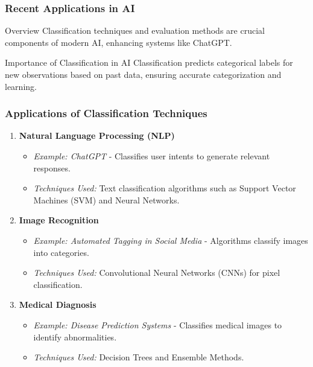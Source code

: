 \documentclass[aspectratio=169]{beamer}
\begin{document}
\begin{frame}[fragile]
    \frametitle{Recent Applications in AI}
    
    \begin{block}{Overview}
        Classification techniques and evaluation methods are crucial components of modern AI, enhancing systems like ChatGPT.
    \end{block}
    
    \begin{block}{Importance of Classification in AI}
        Classification predicts categorical labels for new observations based on past data, ensuring accurate categorization and learning.
    \end{block}
\end{frame}

\begin{frame}[fragile]
    \frametitle{Applications of Classification Techniques}
    
    \begin{enumerate}
        \item \textbf{Natural Language Processing (NLP)}
            \begin{itemize}
                \item \textit{Example: ChatGPT} - Classifies user intents to generate relevant responses.
                \item \textit{Techniques Used:} Text classification algorithms such as Support Vector Machines (SVM) and Neural Networks.
            \end{itemize}
        
        \item \textbf{Image Recognition}
            \begin{itemize}
                \item \textit{Example: Automated Tagging in Social Media} - Algorithms classify images into categories.
                \item \textit{Techniques Used:} Convolutional Neural Networks (CNNs) for pixel classification.
            \end{itemize}
        
        \item \textbf{Medical Diagnosis}
            \begin{itemize}
                \item \textit{Example: Disease Prediction Systems} - Classifies medical images to identify abnormalities.
                \item \textit{Techniques Used:} Decision Trees and Ensemble Methods.
            \end{itemize}
        

\end{enumerate}
\end{frame}
\end{document}
